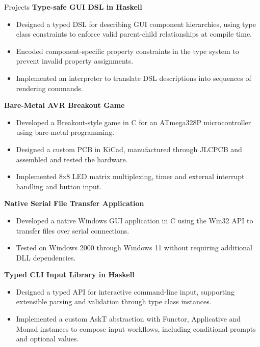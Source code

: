 \documentclass{resume} %
\begin{document}
\begin{rSection}{Projects}
{\bf Type-safe GUI DSL in Haskell }
    \begin{itemize}
        \vspace{-0.3cm}\item Designed a typed DSL for describing GUI component hierarchies, using type class constraints to enforce valid parent-child relationships at compile time.
        \vspace{-0.3cm}\item Encoded component-specific property constraints in the type system to prevent invalid property assignments.
        \vspace{-0.3cm}\item Implemented an interpreter to translate DSL descriptions into sequences of rendering commands.
    \end{itemize}

{\bf Bare-Metal AVR Breakout Game }
    \begin{itemize}
        \vspace{-0.3cm}\item Developed a Breakout-style game in C for an ATmega328P microcontroller using bare-metal programming.
        \vspace{-0.3cm}\item Designed a custom PCB in KiCad, manufactured through JLCPCB and assembled and tested the hardware.
        \vspace{-0.3cm}\item Implemented 8x8 LED matrix multiplexing, timer and external interrupt handling and button input.
    \end{itemize}

{\bf Native Serial File Transfer Application }
    \begin{itemize}
        \vspace{-0.3cm}\item Developed a native Windows GUI application in C using the Win32 API to transfer files over serial connections.
        \vspace{-0.3cm}\item Tested on Windows 2000 through Windows 11 without requiring additional DLL dependencies.
    \end{itemize}

{\bf Typed CLI Input Library in Haskell }
    \begin{itemize}
        \vspace{-0.3cm}\item Designed a typed API for interactive command-line input, supporting extensible parsing and validation through type class instances.
        \vspace{-0.3cm}\item Implemented a custom AskT abstraction with Functor, Applicative and Monad instances to compose input workflows, including conditional prompts and optional values.
    \end{itemize}


\end{rSection}
\end{document}
